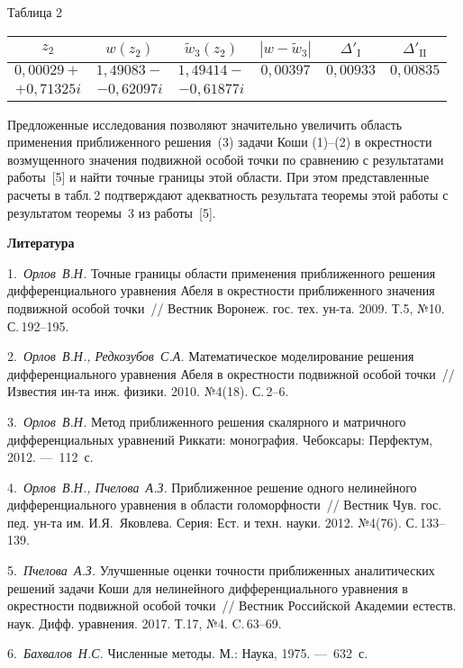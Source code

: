 \begin{table}[tb]
\footnotesize

{\raggedleft Таблица 2

}

\smallskip

{\tabcolsep=2.1mm


\bigskip

\begin{tabular}{|c|c|c|c|c|c|}
\hline
 $z_{2}$&$w(z_{2})$&$\tilde w_{3}(z_{2})$&$|w-\tilde w_{3}|$&$\Delta'_{\mathrm{I}}$&$\Delta'_{\mathrm{II}}$\\
\hline
 $0,00029+$&$1,49083-$&$1,49414-$&$0,00397$&$0,00933$&$0,00835$\\
 $+0,71325i$&$-0,62097i$&$-0,61877i$&&&\\
\hline
\end{tabular}

}
\end{table}

Предложенные исследования позволяют значительно увеличить область применения приближенного решения~(3) задачи
Коши (1)--(2) в окрестности возмущенного значения подвижной особой точки по сравнению с результатами
работы~[5] и найти точные границы этой области. При этом представленные расчеты в табл.\,2 подтверждают
адекватность результата теоремы этой работы с результатом теоремы~3 из работы~[5].

\smallskip
\centerline{\bf Литература}\nopagebreak

1.~{\it Орлов~В.Н.} Точные границы области применения приближенного решения дифференциального уравнения Абеля
в окрестности приближенного значения подвижной особой точки~// Вестник Воронеж. гос. тех. ун-та. 2009. Т.5,
№10. С.\,192--195.

2.~{\it Орлов~В.Н., Редкозубов~С.А.} Математическое моделирование решения дифференциального уравнения Абеля в
окрестности подвижной особой точки~// Известия ин-та инж. физики. 2010. №4(18). С.\,2--6.

3.~{\it Орлов~В.Н.} Метод приближенного решения скалярного и матричного дифференциальных уравнений Риккати:
монография. Чебоксары: Перфектум, 2012. ---~112~с.

4.~{\it Орлов~В.Н., Пчелова~А.З.} Приближенное решение одного нелинейного дифференциального уравнения в
области голоморфности~// Вестник Чув. гос. пед. ун-та им. И.Я.~Яковлева. Серия: Ест. и техн. науки. 2012.
№4(76). С.\,133--139.

5.~{\it Пчелова~А.З.} Улучшенные оценки точности приближенных аналитических решений задачи Коши для
нелинейного дифференциального уравнения в окрестности подвижной особой точки~// Вестник Российской Академии
естеств. наук. Дифф. уравнения. 2017. Т.17, №4. C.\,63--69.

6.~{\it Бахвалов~Н.С.} Численные методы. М.: Наука, 1975. ---~632~с.


